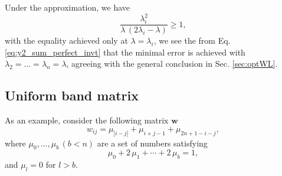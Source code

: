 \documentclass[reprint]{revtex4-1}
\begin{document}
Under the approximation, we have
$$
\frac{ \lambda_i^2 }{ \lambda \, (2 \lambda_i - \lambda) } \ge 1,
$$
with the equality achieved only at $\lambda = \lambda_i$,
we see the from Eq. \eqref{eq:y2_sum_perfect_invt}
that the minimal error is achieved with
$\lambda_2 = \dots = \lambda_n = \lambda$,
agreeing with the general conclusion
in Sec. \ref{sec:optWL}.




\subsection{Uniform band matrix}



As an example, consider the following matrix $\mathbf w$
%
\begin{equation}
  w_{ij} = \mu_{|i-j|} + \mu_{i+j-1} + \mu_{2n+1-i-j},
  \label{eq:w_band}
\end{equation}
%
where $\mu_0, \dots, \mu_b \, (b < n)$
are a set of numbers satisfying
%
\begin{equation}
\mu_0 + 2 \, \mu_1 + \cdots + 2 \, \mu_b = 1,
\label{eq:m_normalization}
\end{equation}
%
and $\mu_l = 0$ for $l > b$.
\end{document}
